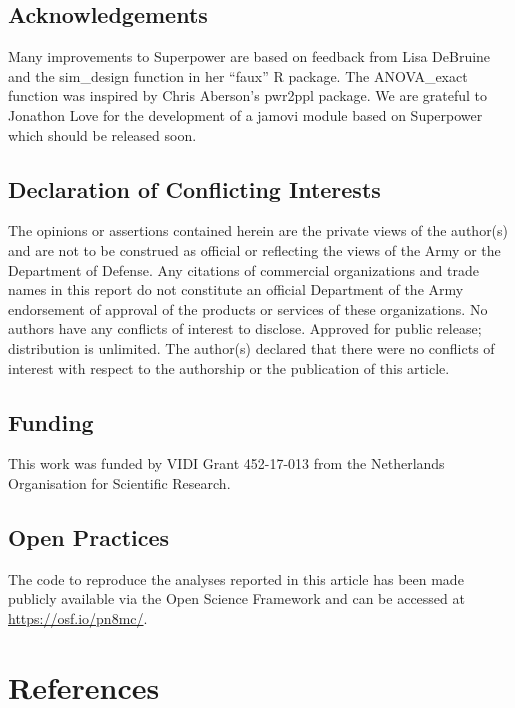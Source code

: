 \documentclass[
  ,man,floatsintext]{apa6}
\begin{document}
\hypertarget{acknowledgements}{%
\subsection{Acknowledgements}\label{acknowledgements}}

Many improvements to Superpower are based on feedback from Lisa DeBruine and the sim\_design function in her \enquote{faux} R package. The ANOVA\_exact function was inspired by Chris Aberson's pwr2ppl package. We are grateful to Jonathon Love for the development of a jamovi module based on Superpower which should be released soon.

\hypertarget{declaration-of-conflicting-interests}{%
\subsection{Declaration of Conflicting Interests}\label{declaration-of-conflicting-interests}}

The opinions or assertions contained herein are the private views of the author(s) and are not to be construed as official or reflecting the views of the Army or the Department of Defense. Any citations of commercial organizations and trade names in this report do not constitute an official Department of the Army endorsement of approval of the products or services of these organizations. No authors have any conflicts of interest to disclose. Approved for public release; distribution is unlimited. The author(s) declared that there were no conflicts of interest with respect to the authorship or the publication of this article.

\hypertarget{funding}{%
\subsection{Funding}\label{funding}}

This work was funded by VIDI Grant 452-17-013 from the Netherlands Organisation for Scientific Research.

\hypertarget{open-practices}{%
\subsection{Open Practices}\label{open-practices}}

The code to reproduce the analyses reported in this article has been made publicly available via the Open Science Framework and can be accessed at \url{https://osf.io/pn8mc/}.

\hypertarget{references}{%
\section{References}\label{references}}
\end{document}
